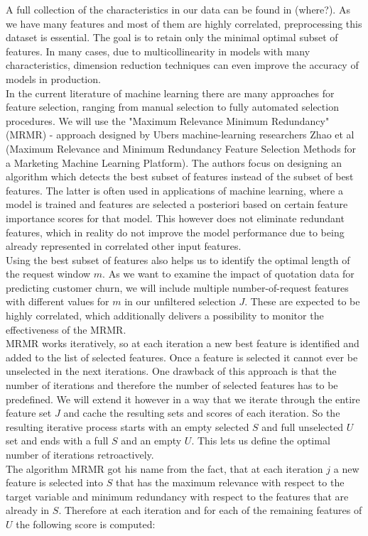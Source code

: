 \documentclass[12pt,titlepage]{article}
\begin{document}
A full collection of the characteristics in our data can be found in (where?). As we have many features and most of them are highly correlated, preprocessing this dataset is essential. The goal is to retain only the minimal optimal subset of features. In many cases, due to multicollinearity in models with many characteristics, dimension reduction techniques can even improve the accuracy of models in production. \\
In the current literature of machine learning there are many approaches for feature selection, ranging from manual selection to fully automated selection procedures. We will use the "Maximum Relevance Minimum Redundancy" (MRMR) - approach designed by Ubers machine-learning researchers Zhao et al (Maximum Relevance and Minimum Redundancy Feature Selection Methods for a Marketing Machine Learning Platform). The authors focus on designing an algorithm which detects the best subset of features instead of the subset of best features. The latter is often used in applications of machine learning, where a model is trained and features are selected a posteriori based on certain feature importance scores for that model. This however does not eliminate redundant features, which in reality do not improve the model performance due to being already represented in correlated other input features. \\
Using the best subset of features also helps us to identify the optimal length of the request window $m$. As we want to examine the impact of quotation data for predicting customer churn, we will include multiple number-of-request features with different values for $m$ in our unfiltered selection $J$. These are expected to be highly correlated, which additionally delivers a possibility to monitor the effectiveness of the MRMR. \\
MRMR works iteratively, so at each iteration a new best feature is identified and added to the list of selected features. Once a feature is selected it cannot ever be unselected in the next iterations. One drawback of this approach is that the number of iterations and therefore the number of selected features has to be predefined. We will extend it however in a way that we iterate through the entire feature set $J$ and cache the resulting sets and scores of each iteration. So the resulting iterative process starts with an empty selected $S$ and full unselected $U$ set and ends with a full $S$ and an empty $U$. This lets us define the optimal number of iterations retroactively. \\
The algorithm MRMR got his name from the fact, that at each iteration $j$ a new feature is selected into $S$ that has the maximum relevance with respect to the target variable and minimum redundancy with respect to the features that are already in $S$. Therefore at each iteration and for each of the remaining features of $U$ the following score is computed: \\
\end{document}
